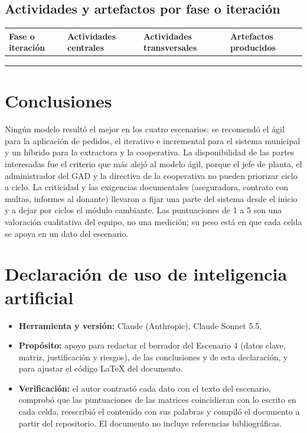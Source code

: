 \documentclass[11pt,a4paper]{article}
\begin{document}
	\subsection{Actividades y artefactos por fase o iteración}
	
	\begin{tabularx}{\textwidth}{|p{2.4cm}|Y|Y|Y|}
		\hline
		\textbf{Fase o iteración} &
		\textbf{Actividades centrales} &
		\textbf{Actividades transversales} &
		\textbf{Artefactos producidos} \\ \hline
		& & & \\[2cm] \hline
		& & & \\[2cm] \hline
		& & & \\[2cm] \hline
	\end{tabularx}
	
	
	\section{Conclusiones}
	
	Ningún modelo resultó el mejor en los cuatro escenarios: se recomendó el ágil para la aplicación de pedidos, el iterativo e incremental para el sistema municipal y un híbrido para la extractora y la cooperativa. La disponibilidad de las partes interesadas fue el criterio que más alejó al modelo ágil, porque el jefe de planta, el administrador del GAD y la directiva de la cooperativa no pueden priorizar ciclo a ciclo. La criticidad y las exigencias documentales (aseguradora, contrato con multas, informes al donante) llevaron a fijar una parte del sistema desde el inicio y a dejar por ciclos el módulo cambiante. Las puntuaciones de 1 a 5 son una valoración cualitativa del equipo, no una medición; su peso está en que cada celda se apoya en un dato del escenario.
	
	
	\section{Declaración de uso de inteligencia artificial}
	
	\begin{itemize}[noitemsep]
		\item \textbf{Herramienta y versión:} Claude (Anthropic), Claude Sonnet 5.5.
		\item \textbf{Propósito:} apoyo para redactar el borrador del Escenario 4 (datos clave, matriz, justificación y riesgos), de las conclusiones y de esta declaración, y para ajustar el código \LaTeX{} del documento.
		\item \textbf{Verificación:} el autor contrastó cada dato con el texto del escenario, comprobó que las puntuaciones de las matrices coincidieran con lo escrito en cada celda, reescribió el contenido con sus palabras y compiló el documento a partir del repositorio. El documento no incluye referencias bibliográficas.
	\end{itemize}
	
\end{document}
